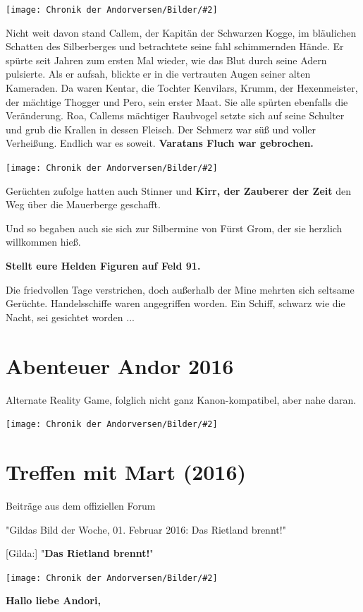 \documentclass[10pt, a4paper, oneside]{book}
\newcommand{\fillbreak}{\vspace*{\fill}\columnbreak}
\newcommand{\produkt}[1]{%
    \section{#1}%
    \label{Produkt: #1}%
}
\newcommand{\storytext}[1]{%
    \section{#1}%
    \label{Storytext: #1}%
}
\newcommand{\bildmitts}[2][height=0.32\textwidth,width=0.48\textwidth,keepaspectratio]{%
    \begin{center}
        \texttt{[image: Chronik der Andorversen/Bilder/\#2]}
    \end{center}
}
\begin{document}
\begin{multicols}{2}
\bildmitts{Ein Schiff so schwarz wie die Nacht Bild 2.jpg}

Nicht weit davon stand Callem, der Kapitän der Schwarzen Kogge, im bläulichen Schatten des Silberberges und betrachtete seine fahl schimmernden Hände. Er spürte seit Jahren zum ersten Mal wieder, wie das Blut durch seine Adern pulsierte. Als er aufsah, blickte er in die vertrauten Augen seiner alten Kameraden. Da waren Kentar, die Tochter Kenvilars, Krumm, der Hexenmeister, der mächtige Thogger und Pero, sein erster Maat. Sie alle spürten ebenfalls die Veränderung. Roa, Callems mächtiger Raubvogel setzte sich auf seine Schulter und grub die Krallen in dessen Fleisch. Der Schmerz war süß und voller Verheißung. Endlich war es soweit. \textbf{Varatans Fluch war gebrochen.}

\bildmitts{Ein Schiff so schwarz wie die Nacht Bild 1.jpg}

Gerüchten zufolge hatten auch Stinner und \textbf{Kirr, der Zauberer der Zeit} den Weg über die Mauerberge geschafft.

Und so begaben auch sie sich zur Silbermine von Fürst Grom, der sie herzlich willkommen hieß.

\textbf{Stellt eure Helden Figuren auf Feld 91.}

Die friedvollen Tage verstrichen, doch außerhalb der Mine mehrten sich seltsame Gerüchte. Handelsschiffe waren angegriffen worden. Ein Schiff, schwarz wie die Nacht, sei gesichtet worden ...





\fillbreak
\produkt{Abenteuer Andor 2016}

\begin{center}
    Alternate Reality Game, folglich nicht ganz Kanon-kompatibel, aber nahe daran.
\end{center}

\bildmitts{AA2016 Blog 1.jpeg}

\storytext{Treffen mit Mart (2016)}

\begin{center}
    Beiträge aus dem offiziellen Forum

    "Gildas Bild der Woche, 01. Februar 2016: Das Rietland brennt!"
\end{center}


[Gilda:] "\textbf{Das Rietland brennt!}"

\bildmitts{AA2016 Das Rietland brennt 1.jpeg}

\textbf{Hallo liebe Andori,}


\end{multicols}
\end{document}
